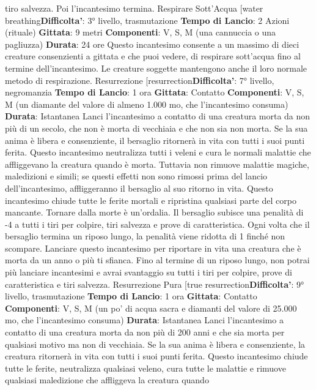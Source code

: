 \begin{multicols}{2}
tiro salvezza. Poi l’incantesimo termina.
Respirare Sott’Acqua
[water breathing\textbf{Difficolta'}:
3° livello, trasmutazione
\textbf{Tempo di Lancio}: 2 Azioni (rituale)
\textbf{Gittata}: 9 metri
\textbf{Componenti}: V, S, M (una cannuccia o una pagliuzza)
\textbf{Durata}: 24 ore
Questo incantesimo consente a un massimo di dieci
creature consenzienti a gittata e che puoi vedere, di
respirare sott’acqua fino al termine dell’incantesimo. Le
creature soggette mantengono anche il loro normale
metodo di respirazione.
Resurrezione
[resurrection\textbf{Difficolta'}:
7° livello, negromanzia
\textbf{Tempo di Lancio}: 1 ora
\textbf{Gittata}: Contatto
\textbf{Componenti}: V, S, M (un diamante del valore di
almeno 1.000 mo, che l’incantesimo consuma)
\textbf{Durata}: Istantanea
Lanci l’incantesimo a contatto di una creatura morta da
non più di un secolo, che non è morta di vecchiaia e
che non sia non morta. Se la sua anima è libera e
consenziente, il bersaglio ritornerà in vita con tutti i suoi
punti ferita.
Questo incantesimo neutralizza tutti i veleni e cura le
normali malattie che affliggevano la creatura quando è
morta. Tuttavia non rimuove malattie magiche,
maledizioni e simili; se questi effetti non sono rimossi
prima del lancio dell’incantesimo, affliggeranno il
bersaglio al suo ritorno in vita.
Questo incantesimo chiude tutte le ferite mortali e
ripristina qualsiasi parte del corpo mancante.
Tornare dalla morte è un’ordalia. Il bersaglio subisce
una penalità di -4 a tutti i tiri per colpire, tiri salvezza e
prove di caratteristica. Ogni volta che il bersaglio
termina un riposo lungo, la penalità viene ridotta di 1
finché non scompare.
Lanciare questo incantesimo per riportare in vita una
creatura che è morta da un anno o più ti sfianca. Fino al
termine di un riposo lungo, non potrai più lanciare
incantesimi e avrai svantaggio su tutti i tiri per colpire,
prove di caratteristica e tiri salvezza.
Resurrezione Pura
[true resurrection\textbf{Difficolta'}:
9° livello, trasmutazione
\textbf{Tempo di Lancio}: 1 ora
\textbf{Gittata}: Contatto
\textbf{Componenti}: V, S, M (un po’ di acqua sacra e diamanti
del valore di 25.000 mo, che l’incantesimo consuma)
\textbf{Durata}: Istantanea
Lanci l’incantesimo a contatto di una creatura morta da
non più di 200 anni e che sia morta per qualsiasi motivo
ma non di vecchiaia. Se la sua anima è libera e
consenziente, la creatura ritornerà in vita con tutti i suoi
punti ferita.
Questo incantesimo chiude tutte le ferite, neutralizza
qualsiasi veleno, cura tutte le malattie e rimuove
qualsiasi maledizione che affliggeva la creatura quando

\end{multicols}
